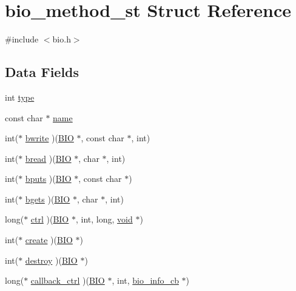 \hypertarget{structbio__method__st}{}\section{bio\+\_\+method\+\_\+st Struct Reference}
\label{structbio__method__st}


{\ttfamily \#include $<$bio.\+h$>$}

\subsection*{Data Fields}
\begin{DoxyCompactItemize}
\item 
int \hyperlink{structbio__method__st_ac765329451135abec74c45e1897abf26}{type}
\item 
const char $\ast$ \hyperlink{structbio__method__st_afcd1706c9144e6d6eee6127661ae3be2}{name}
\item 
int($\ast$ \hyperlink{structbio__method__st_a21c8cf83ef05caa4fc72edd982d1092a}{bwrite} )(\hyperlink{crypto_2bio_2bio_8h_af3fabae1c9af50b9312cdff41e11d1dd}{B\+IO} $\ast$, const char $\ast$, int)
\item 
int($\ast$ \hyperlink{structbio__method__st_a11da462f309fae57ae2132ae6ded814f}{bread} )(\hyperlink{crypto_2bio_2bio_8h_af3fabae1c9af50b9312cdff41e11d1dd}{B\+IO} $\ast$, char $\ast$, int)
\item 
int($\ast$ \hyperlink{structbio__method__st_a5d479bf01f29d87cd8bcc2dd72dede43}{bputs} )(\hyperlink{crypto_2bio_2bio_8h_af3fabae1c9af50b9312cdff41e11d1dd}{B\+IO} $\ast$, const char $\ast$)
\item 
int($\ast$ \hyperlink{structbio__method__st_a784cc94a819cc79e25adf02ce34c762b}{bgets} )(\hyperlink{crypto_2bio_2bio_8h_af3fabae1c9af50b9312cdff41e11d1dd}{B\+IO} $\ast$, char $\ast$, int)
\item 
long($\ast$ \hyperlink{structbio__method__st_a5a79d5b0f349eec2bb356e769bbe0a2b}{ctrl} )(\hyperlink{crypto_2bio_2bio_8h_af3fabae1c9af50b9312cdff41e11d1dd}{B\+IO} $\ast$, int, long, \hyperlink{hw__4758__cca_8h_afad4d591c7931ff6dc5bf69c76c96aa0}{void} $\ast$)
\item 
int($\ast$ \hyperlink{structbio__method__st_ac775170e5332802bf577c00e8e7bb003}{create} )(\hyperlink{crypto_2bio_2bio_8h_af3fabae1c9af50b9312cdff41e11d1dd}{B\+IO} $\ast$)
\item 
int($\ast$ \hyperlink{structbio__method__st_afa34caa5033a0c66a5e9baf4eaf7e69d}{destroy} )(\hyperlink{crypto_2bio_2bio_8h_af3fabae1c9af50b9312cdff41e11d1dd}{B\+IO} $\ast$)
\item 
long($\ast$ \hyperlink{structbio__method__st_abcdb621b50de7d3aac8b52cc87652f7a}{callback\+\_\+ctrl} )(\hyperlink{crypto_2bio_2bio_8h_af3fabae1c9af50b9312cdff41e11d1dd}{B\+IO} $\ast$, int, \hyperlink{include_2openssl_2bio_8h_af5a44f8335db9b99313117d56add298c}{bio\+\_\+info\+\_\+cb} $\ast$)
\end{DoxyCompactItemize}


